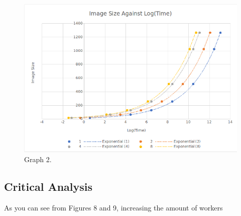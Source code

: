 \documentclass{article}
\begin{document}
\begin{figure}[H]
\centering
\includegraphics[width=15cm]{ImvsLog(Time)(BeforePow).png}
\caption{Graph 2.}
\end{figure}

\newpage


\begin{multicols}{2}

\section{Critical Analysis}
As you can see from Figures 8 and 9, increasing the amount of workers

\end{multicols}

\end{document}
